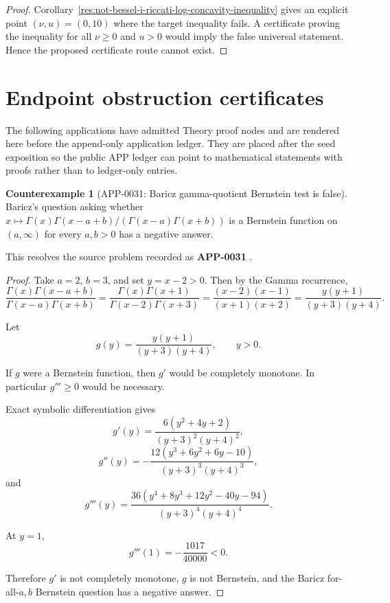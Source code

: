 \documentclass[11pt]{article}
\numberwithin{equation}{section}
\theoremstyle{definition}
\newtheorem{counterexample}[theorem]{Counterexample}
\theoremstyle{remark}
\newcommand{\1}{\mathbf 1}
\begin{document}
\begin{proof}
Corollary~\ref{res:not-bessel-i-riccati-log-concavity-inequality} gives an explicit point \((\nu,u)=(0,10)\) where the target inequality fails.  A certificate proving the inequality for all \(\nu\ge0\) and \(u>0\) would imply the false universal statement.  Hence the proposed certificate route cannot exist.
\end{proof}

\section{Endpoint obstruction certificates}
\label{sec:endpoint-obstruction-certificates}
The following applications have admitted Theory proof nodes and are rendered here before the append-only application ledger.  They are placed after the seed exposition so the public APP ledger can point to mathematical statements with proofs rather than to ledger-only entries.

\begin{counterexample}[APP-0031: Baricz gamma-quotient Bernstein test is false]
\label{res:baricz-gamma-quotient-bf-forall-negative-answer}
Baricz's question asking whether \(x\mapsto\Gamma(x)\Gamma(x-a+b)/(\Gamma(x-a)\Gamma(x+b))\) is a Bernstein function on \((a,\infty)\) for every \(a,b>0\) has a negative answer.

This resolves the source problem recorded as \textbf{APP-0031} \cite{baricz-turan}.
\end{counterexample}

\begin{proof}
Take \(a=2\), \(b=3\), and set \(y=x-2>0\). Then by the Gamma recurrence,
\[
\frac{\Gamma(x)\Gamma(x-a+b)}{\Gamma(x-a)\Gamma(x+b)}
=\frac{\Gamma(x)\Gamma(x+1)}{\Gamma(x-2)\Gamma(x+3)}
=\frac{(x-2)(x-1)}{(x+1)(x+2)}
=\frac{y(y+1)}{(y+3)(y+4)}.
\]

Let
\[
g(y)=\frac{y(y+1)}{(y+3)(y+4)},\qquad y>0.
\]

If \(g\) were a Bernstein function, then \(g'\) would be completely monotone. In particular \(g'''\ge0\) would be necessary.

Exact symbolic differentiation gives
\[
g'(y)=\frac{6(y^2+4y+2)}{(y+3)^2(y+4)^2},
\]
\[
g''(y)=
-\frac{12(y^3+6y^2+6y-10)}{(y+3)^3(y+4)^3},
\]
and
\[
g'''(y)=
\frac{36(y^4+8y^3+12y^2-40y-94)}{(y+3)^4(y+4)^4}.
\]

At \(y=1\),
\[
g'''(1)=-\frac{1017}{40000}<0.
\]

Therefore \(g'\) is not completely monotone, \(g\) is not Bernstein, and the Baricz for-all-\(a,b\) Bernstein question has a negative answer.
\end{proof}
\end{document}
